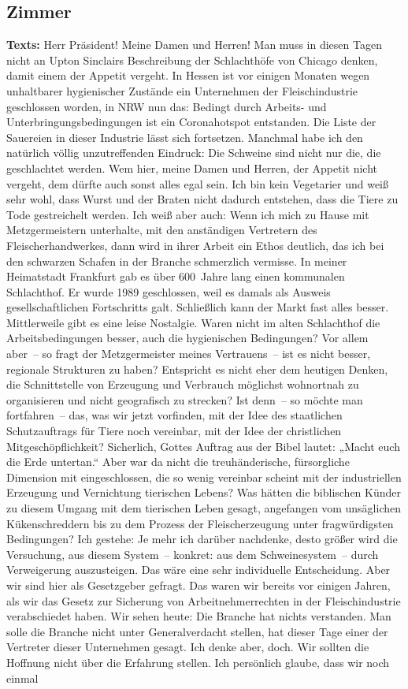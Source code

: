 \documentclass{article}
\begin{document}
\subsection{Zimmer}
\noindent\textbf{Texts:} Herr Präsident! Meine Damen und Herren! Man muss in diesen Tagen nicht an Upton Sinclairs Beschreibung der Schlachthöfe von Chicago denken, damit einem der Appetit vergeht. In Hessen ist vor einigen Monaten wegen unhaltbarer hygienischer Zustände ein Unternehmen der Fleischindustrie geschlossen worden, in NRW nun das: Bedingt durch Arbeits- und Unterbringungsbedingungen ist ein Coronahotspot entstanden. Die Liste der Sauereien in dieser Industrie lässt sich fortsetzen. Manchmal habe ich den natürlich völlig unzutreffenden Eindruck: Die Schweine sind nicht nur die, die geschlachtet werden.  Wem hier, meine Damen und Herren, der Appetit nicht vergeht, dem dürfte auch sonst alles egal sein. Ich bin kein Vegetarier und weiß sehr wohl, dass Wurst und der Braten nicht dadurch entstehen, dass die Tiere zu Tode gestreichelt werden. Ich weiß aber auch: Wenn ich mich zu Hause mit Metzgermeistern unterhalte, mit den anständigen Vertretern des Fleischerhandwerkes, dann wird in ihrer Arbeit ein Ethos deutlich, das ich bei den schwarzen Schafen in der Branche schmerzlich vermisse. In meiner Heimatstadt Frankfurt gab es über 600 Jahre lang einen kommunalen Schlachthof. Er wurde 1989 geschlossen, weil es damals als Ausweis gesellschaftlichen Fortschritts galt. Schließlich kann der Markt fast alles besser. Mittlerweile gibt es eine leise Nostalgie. Waren nicht im alten Schlachthof die Arbeitsbedingungen besser, auch die hygienischen Bedingungen? Vor allem aber – so fragt der Metzgermeister meines Vertrauens – ist es nicht besser, regionale Strukturen zu haben? Entspricht es nicht eher dem heutigen Denken, die Schnittstelle von Erzeugung und Verbrauch möglichst wohnortnah zu organisieren und nicht geografisch zu strecken? Ist denn – so möchte man fortfahren – das, was wir jetzt vorfinden, mit der Idee des staatlichen Schutzauftrags für Tiere noch vereinbar, mit der Idee der christlichen Mitgeschöpflichkeit? Sicherlich, Gottes Auftrag aus der Bibel lautet: „Macht euch die Erde untertan.“ Aber war da nicht die treuhänderische, fürsorgliche Dimension mit eingeschlossen, die so wenig vereinbar scheint mit der industriellen Erzeugung und Vernichtung tierischen Lebens? Was hätten die biblischen Künder zu diesem Umgang mit dem tierischen Leben gesagt, angefangen vom unsäglichen Kükenschreddern bis zu dem Prozess der Fleischerzeugung unter fragwürdigsten Bedingungen? Ich gestehe: Je mehr ich darüber nachdenke, desto größer wird die Versuchung, aus diesem System – konkret: aus dem Schweinesystem – durch Verweigerung auszusteigen. Das wäre eine sehr individuelle Entscheidung. Aber wir sind hier als Gesetzgeber gefragt. Das waren wir bereits vor einigen Jahren, als wir das Gesetz zur Sicherung von Arbeitnehmerrechten in der Fleischindustrie verabschiedet haben. Wir sehen heute: Die Branche hat nichts verstanden. Man solle die Branche nicht unter Generalverdacht stellen, hat dieser Tage einer der Vertreter dieser Unternehmen gesagt. Ich denke aber, doch. Wir sollten die Hoffnung nicht über die Erfahrung stellen.  Ich persönlich glaube, dass wir noch einmal 
\end{document}
